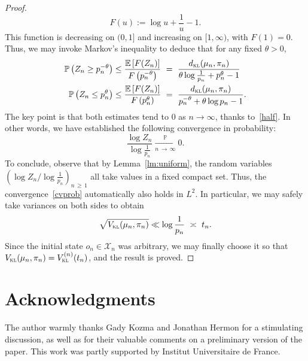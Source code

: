 \documentclass[AHL,Unicode,longabstracts,published]{cedram}
\newcommand{\EE}{{\mathbb{E}}}
\newcommand{\PP}{\mathbb{P}}
\newcommand{\cX}{\mathcal{X}}
\newcommand{\dkl}{d_{\textsc{kl}}}
\newcommand{\vkl}{V_{\textsc{kl}}}
\begin{document}
\begin{proof}
\[
F(u) := \log u+\frac{1}{u}-1.
\]
This function is decreasing on $(0,1]$ and increasing on $[1,\infty)$, with $F(1)=0$. Thus, we may invoke Markov's inequality to deduce that for any fixed $\theta>0$,
\begin{align*}
\PP\left(Z_n\ge p_n^{-\theta}\right) & \le \frac{\EE\left[F(Z_n)\right]}{F\left(p_n^{-\theta}\right)} \ = \ \frac{\dkl(\mu_n,\pi_n)}{\theta\log \frac{1}{p_n} +p_n^{\theta}-1} \\
\PP\left(Z_n\le p_n^{\theta}\right) & \le \frac{\EE\left[F(Z_n)\right]}{F\left(p_n^{\theta}\right)} \ = \ \frac{\dkl(\mu_n,\pi_n)}{p_n^{-\theta}+\theta\log p_n-1}.
\end{align*}
The key point is that both estimates tend to $0$ as $n\to\infty$, thanks to~\eqref{half}. In other words, we have established the following convergence in probability:
\begin{equation}\label{cvprob}
\frac{\log Z_n}{\log \frac{1}{p_n}} \xrightarrow[n\,\to\,\infty]{\PP} 0.
\end{equation}
To conclude, observe that by Lemma~\ref{lm:uniform}, the random variables $\left({\log Z_n}/{\log \frac{1}{p_n}}\right)_{n\,\ge\,1}$ all take values in a fixed compact set. Thus, the convergence~\eqref{cvprob} automatically also holds in $L^2$. In particular, we may safely take variances on both sides to obtain
\[
\sqrt{\vkl(\mu_n,\pi_n)} \ll \log\frac{1}{p_n} \ \asymp \ t_n.
\]
Since the initial state $o_n\in\cX_n$ was arbitrary, we may finally choose it so that $\vkl(\mu_n,\pi_n)=\vkl^{(n)}(t_n)$, and the result is proved.
\end{proof}


\section*{Acknowledgments}

The author warmly thanks Gady Kozma and Jonathan Hermon for a stimulating discussion, as well as for their valuable comments on a preliminary version of the paper. This work was partly supported by Institut Universitaire de France.



\end{document}

